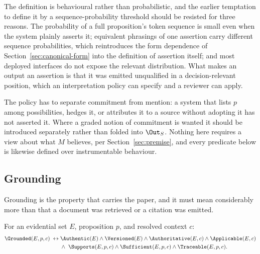 The definition is behavioural rather than probabilistic, and the earlier temptation to
define it by a sequence-probability threshold should be resisted for three reasons. The
probability of a full proposition's token sequence is small even when the system plainly
asserts it; equivalent phrasings of one assertion carry different sequence probabilities,
which reintroduces the form dependence of Section~\ref{sec:canonical-form} into the
definition of assertion itself; and most deployed interfaces do not expose the relevant
distribution. What makes an output an assertion is that it was emitted unqualified in a
decision-relevant position, which an interpretation policy can specify and a reviewer can
apply.

The policy has to separate commitment from mention: a system that lists $p$ among
possibilities, hedges it, or attributes it to a source without adopting it has not asserted
it. Where a graded notion of commitment is wanted it should be introduced separately
rather than folded into $\Out_S$. Nothing here requires a view about what
$M$ believes, per Section~\ref{sec:premise}, and every predicate below is likewise
defined over instrumentable behaviour.

\subsection{Grounding}
\label{sec:grounding-def}

Grounding is the property that carries the paper, and it must mean considerably
more than that a document was retrieved or a citation was emitted.

\begin{definition}
\label{def:grounded-evidence}
For an evidential set $E$, proposition $p$, and resolved context $c$:
\begin{equation}
  \begin{aligned}
  \Grounded(E, p, c) \;\leftrightarrow\;
    &\Authentic(E) \wedge \Versioned(E) \wedge \Authoritative(E, c)
      \wedge \Applicable(E, c)\\
    &\wedge\ \Supports(E, p, c) \wedge \Sufficient(E, p, c)
      \wedge \Traceable(E, p, c).
  \end{aligned}
  \label{eq:grounded}
\end{equation}
\end{definition}

